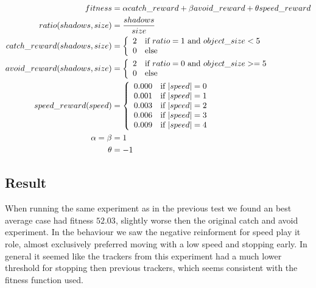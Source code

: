 \documentclass[12pt]{article}
\begin{document}
	\begin{align}
		fitness &= \alpha catch\_reward+\beta avoid\_reward+\theta speed\_reward\nonumber\\
		ratio(shadows, size) &= \frac{shadows}{size}\nonumber\\
		catch\_reward(shadows, size) &= \left\{ 
			\begin{array}{l l}
				2 &\text{if $ratio=1$ and $object\_size < 5$} \\
				0 &\text{else}
			\end{array} \right.\nonumber\\
				avoid\_reward(shadows, size) &= \left\{ 
					\begin{array}{l l}
						2 &\text{if $ratio=0$ and $object\_size >= 5$} \\
						0 &\text{else}
					\end{array} \right.\nonumber\\
				speed\_reward(speed) &= \left\{ 
				\begin{array}{l l}
					0.000 &\text{if $|speed| = 0$} \\
					0.001 &\text{if $|speed| = 1$} \\
					0.003 &\text{if $|speed| = 2$} \\
					0.006 &\text{if $|speed| = 3$} \\
					0.009 &\text{if $|speed| = 4$} \\
       \end{array} \right.\nonumber\\
			 \alpha =\beta &= 1\nonumber\\
			 \theta &= -1\nonumber
		\end{align}
	
	\subsection{Result}
		When running the same experiment as in the previous test we found an best average case had fitness $52.03$, slightly worse then the original catch and avoid experiment. In the behaviour we saw the negative reinforment for speed play it role, almost exclusively preferred moving with a low speed and stopping early. In general it seemed like the trackers from this experiment had a much lower threshold for stopping then previous trackers, which seems consistent with the fitness function used. 
		
\end{document}
